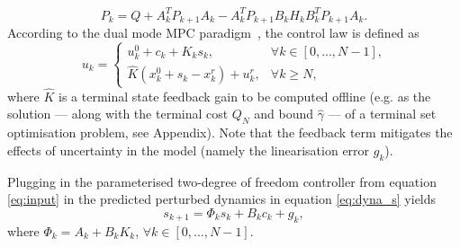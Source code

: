 \documentclass[letterpaper, 10 pt, conference]{ieeeconf}
\begin{document}
\begin{equation}
\label{eq:dp3}
P_k = Q + A_k^T P_{k+1} A_k - A_k^T P_{k+1}B_k H_k B_k^T P_{k+1} A_k. 
\end{equation}
According to the dual mode MPC paradigm~\cite{mayne2000constrained}, the control law is defined as
\[
u_k = \begin{cases}
			u^0_k + c_k + K_k s_k, & \text{$\forall k \in [0, ..., N-1]$,}\\
            \hat{K}(x_k^0 + s_k - x_k^r) + u^r_k, & \text{$\forall k \geq N$,}
		 \end{cases}
\] 
where $\hat{K}$ is a terminal state feedback gain to be computed offline (e.g. as the solution --- along with the terminal cost $Q_N$ and bound $\hat{\gamma}$ --- of a terminal set optimisation problem, see Appendix). Note that the feedback term mitigates the effects of uncertainty in the model (namely the linearisation error $g_k$). 

Plugging in the parameterised two-degree of freedom controller from equation \eqref{eq:input} in the predicted perturbed dynamics in equation \eqref{eq:dyna_s} yields
%
\[
s_{k+1} = \Phi_k s_k + B_k c_k + g_k, 
\]
where $\Phi_k = A_k +  B_k K_k$, $\forall k \in [0, ..., N-1]$. 
\end{document}
